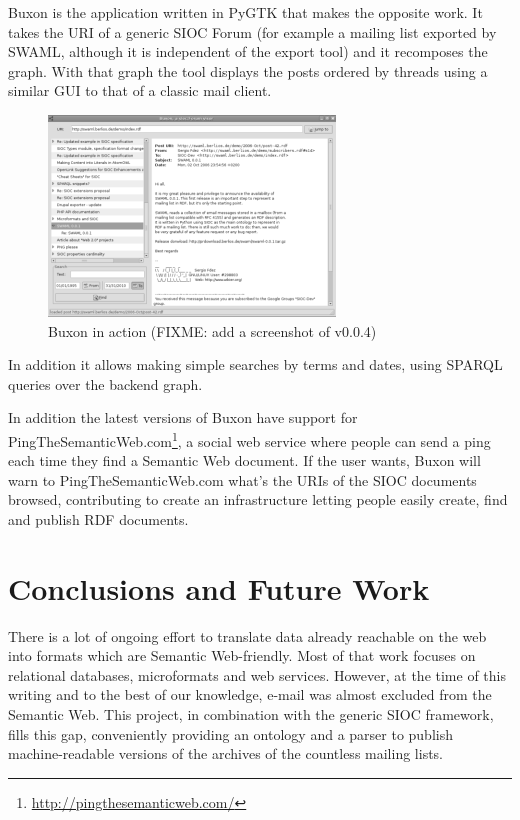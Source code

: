 \documentclass{llncs}
\begin{document}
Buxon is the application written in PyGTK that makes the opposite work. It 
takes the URI of a generic SIOC Forum (for example a mailing list exported 
by SWAML, although it is independent of the export tool) and it recomposes 
the graph. With that graph the tool displays the posts ordered by threads using 
a similar GUI to that of a classic mail client.

\begin{figure}[ht]
 \centering
 \includegraphics[bb=0 0 288 202]{images/buxon.png}
 \caption{Buxon in action (FIXME: add a screenshot of v0.0.4)}
\end{figure}

In addition it allows making simple searches by terms and dates, using
SPARQL queries over the backend graph.

In addition the latest versions of Buxon have support for 
PingTheSemanticWeb.com\footnote{\url{http://pingthesemanticweb.com/}}, 
a social web service where people can send a ping each time they find 
a Semantic Web document. If the user wants, Buxon will warn to 
PingTheSemanticWeb.com what's the URIs of the SIOC documents browsed,
contributing to create an infrastructure letting people easily create, 
find and publish RDF documents.

\section{\label{sec:conclusions}Conclusions and Future Work}

There is a lot of ongoing effort to translate data already reachable
on the web into formats which are Semantic Web-friendly. Most of that 
work focuses on relational databases, microformats and web services. 
However, at the time of this writing and to the best of our knowledge, 
e-mail was almost excluded from the Semantic Web. This project, in 
combination with the generic SIOC framework, fills this gap, conveniently 
providing an ontology and a parser to publish machine-readable versions 
of the archives of the countless mailing lists.
\end{document}
